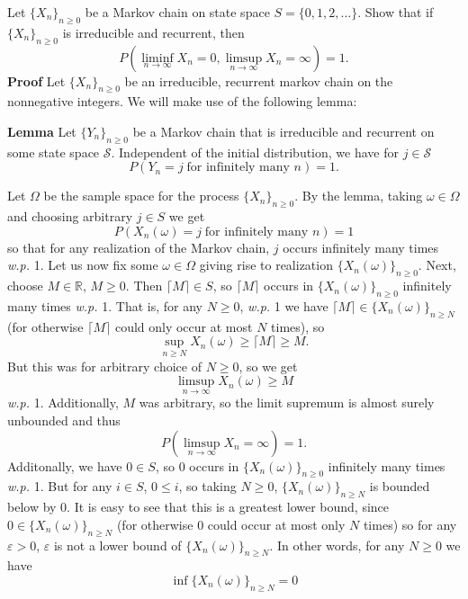 \documentclass[11pt, letterpaper]{article}
\newcommand{\mbb}[1]{\mathbb{#1}}
\newcommand{\mc}[1]{\mathcal{#1}}
\begin{document}
     Let $\{X_n\}_{n\geq 0}$ be a Markov chain on state space $S=\{0,1,2,\dots\}$. Show that if $\{X_n\}_{n\geq 0}$ is irreducible and recurrent, then
    \[P\left(\liminf_{n\rightarrow\infty}X_n=0,\limsup_{n\rightarrow\infty} X_n=\infty\right)=1.\]
    {\bf Proof} Let $\{X_n\}_{n\geq 0}$ be an irreducible, recurrent markov chain on the nonnegative integers. We will make use of the following lemma:
    \begin{center}
        \begin{minipage}[c]{0.85\linewidth}
            {\bf Lemma} Let $\{Y_n\}_{n\geq 0}$ be a Markov chain that is irreducible and recurrent on some state space $\mc{S}$. Independent of the initial distribution, we have for $j\in\mc{S}$
            \[P(Y_n=j\;\text{for infinitely many $n$})=1.\]  
        \end{minipage}
    \end{center}\vspace{10pt}
    Let $\Omega$ be the sample space for the process $\{X_n\}_{n\geq 0}$. By the lemma, taking $\omega\in\Omega$ and choosing arbitrary $j\in S$ we get
    \[P(X_n(\omega)=j\;\text{for infinitely many $n$})=1\]
    so that for any realization of the Markov chain, $j$ occurs infinitely many times {\it w.p.} 1.
    Let us now fix some $\omega\in\Omega$ giving rise to realization $\{X_n(\omega)\}_{n\geq 0}$. Next, choose $M\in\mbb{R}$, $M\geq 0$. Then $\lceil M\rceil\in S$, so $\lceil M\rceil$ occurs in $\{X_n(\omega)\}_{n\geq 0}$ infinitely many times {\it w.p.} 1.
    That is, for any $N\geq 0$, {\it w.p.} 1 we have $\lceil M\rceil\in\{X_n(\omega)\}_{n\geq N}$ (for otherwise $\lceil M\rceil$ could only occur at most $N$ times), so
    \[\sup_{n\geq N}X_n(\omega)\geq\lceil M\rceil\geq M.\]
    But this was for arbitrary choice of $N\geq 0$, so we get
    \[\limsup_{n\rightarrow\infty}X_n(\omega)\geq M\]
    {\it w.p.} 1. Additionally, $M$ was arbitrary, so the limit supremum is almost surely unbounded and thus
    \[P(\limsup_{n\rightarrow\infty}X_n=\infty)=1.\tag{4}\]
    Additonally, we have $0\in S$, so $0$ occurs in $\{X_n(\omega)\}_{n\geq 0}$ infinitely many times {\it w.p.} 1. But for any $i\in S$, $0\leq i$, so taking $N\geq 0$, $\{X_n(\omega)\}_{n\geq N}$ is bounded below by $0$. It is easy to see that this is a greatest lower bound,
    since $0\in\{X_n(\omega)\}_{n\geq N}$ (for otherwise $0$ could occur at most only $N$ times) so for any $\varepsilon>0$, $\varepsilon$ is not a lower bound of $\{X_n(\omega)\}_{n\geq N}$. In other words, for any $N\geq 0$ we have
    \[\inf\{X_n(\omega)\}_{n\geq N}=0\]
\end{document}
